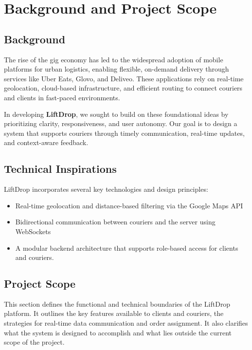 \section{Background and Project Scope}
\subsection{Background}

The rise of the gig economy has led to the widespread adoption of mobile platforms for urban logistics, enabling flexible, on-demand delivery through services like Uber Eats, Glovo, and Deliveo. These applications rely on real-time geolocation, cloud-based infrastructure, and efficient routing to connect couriers and clients in fast-paced environments.

In developing \textbf{LiftDrop}, we sought to build on these foundational ideas by prioritizing clarity, responsiveness, and user autonomy. Our goal is to design a system that supports couriers through timely communication, real-time updates, and context-aware feedback.

\vspace{2mm}

\subsection*{Technical Inspirations}

LiftDrop incorporates several key technologies and design principles:

\begin{itemize}
    \item Real-time geolocation and distance-based filtering via the Google Maps API
    \item Bidirectional communication between couriers and the server using WebSockets
    \item A modular backend architecture that supports role-based access for clients and couriers.
\end{itemize}

\vspace{2mm}

\subsection{Project Scope}

This section defines the functional and technical boundaries of the LiftDrop platform. It outlines the key features available to clients and couriers, the strategies for real-time data communication and order assignment. It also clarifies what the system is designed to accomplish and what lies outside the current scope of the project.

